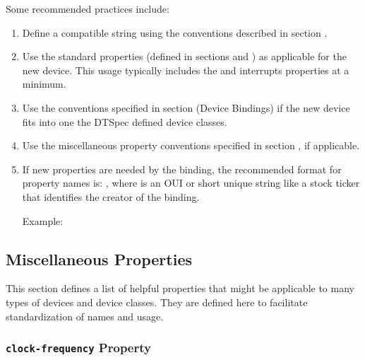 \documentclass[a4paper,10pt,oneside]{sphinxmanual}
\begin{document}
Some recommended practices include:
\begin{enumerate}
\item {} 
Define a compatible string using the conventions described in section
{\hyperref[devicetree\string-basics:sect\string-standard\string-properties\string-compatible]{}}.

\item {} 
Use the standard properties (defined in sections
{\hyperref[devicetree\string-basics:sect\string-standard\string-properties]{}} and {\hyperref[devicetree\string-basics:sect\string-interrupts]{}}) as
applicable for the new device. This usage typically includes the
 and interrupts properties at a minimum.

\item {} 
Use the conventions specified in section {\hyperref[device\string-bindings:chapter\string-device\string-bindings]{}}
(Device Bindings) if the new device fits into one the DTSpec defined
device classes.

\item {} 
Use the miscellaneous property conventions specified in section
{\hyperref[device\string-bindings:sect\string-misc\string-properties]{}}, if applicable.

\item {} 
If new properties are needed by the binding, the recommended format
for property names is: , where 
is an OUI or short unique string like a stock ticker that identifies
the creator of the binding.

Example: 

\end{enumerate}


\subsection{Miscellaneous Properties}
\label{device-bindings:sect-misc-properties}\label{device-bindings:miscellaneous-properties}
This section defines a list of helpful properties that might be
applicable to many types of devices and device classes. They are defined
here to facilitate standardization of names and usage.


\subsubsection{\texttt{clock-frequency} Property}
\label{device-bindings:clock-frequency-property}
\end{document}
